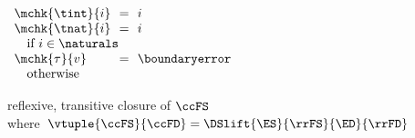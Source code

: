 \begin{flushleft}
\smallskip
\begin{minipage}[t]{\columnwidth}
\end{minipage}\hspace{\columnsep}%
\begin{minipage}[t]{\columnwidth}
{
$\begin{array}{l@{~~}c@{~~}l}
  \mchk{\tint}{i} & = & i
\\
  \mchk{\tnat}{i} & = & i
\\ \multicolumn{3}{l}{\mbox{\quad if $i \in \naturals$}}
\\
  \mchk{\tau}{v} & = & \boundaryerror
\\ \multicolumn{3}{l}{\mbox{\quad otherwise}}
\end{array}$
}
\end{minipage}

\smallskip
{} reflexive, transitive closure of $\ccFS$\\
\mbox{\quad where $\vtuple{\ccFS}{\ccFD} = \DSlift{\ES}{\rrFS}{\ED}{\rrFD}$}
\end{flushleft}
